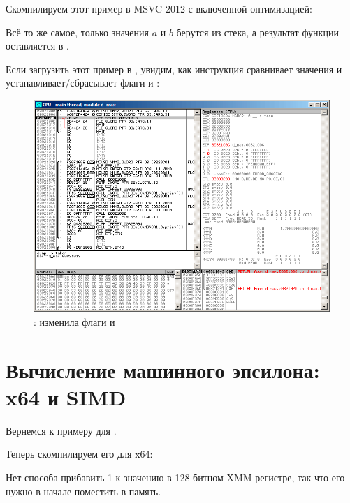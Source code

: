 Скомпилируем этот пример в MSVC 2012 с включенной оптимизацией:



Всё то же самое, только значения $a$ и $b$ 
берутся из стека, а результат функции оставляется в .

Если загрузить этот пример в \olly, 
увидим, как инструкция  сравнивает значения и устанавливает/сбрасывает
флаги \CF и \PF:

\begin{figure}[H]
\centering
\includegraphics[scale=\FigScale]{patterns/205_floating_SIMD/d_max_olly.png}
\caption{\olly:  изменила флаги \CF и \PF}
\label{fig:FPU_SIMD_d_max_olly}
\end{figure}

\section{Вычисление машинного эпсилона: x64 и SIMD}
\label{machine_epsilon_x64_and_SIMD}

Вернемся к примеру  для \Tdouble {}.

Теперь скомпилируем его для x64:



Нет способа прибавить 1 к значению в 128-битном XMM-регистре, так что его нужно в начале поместить в память.

